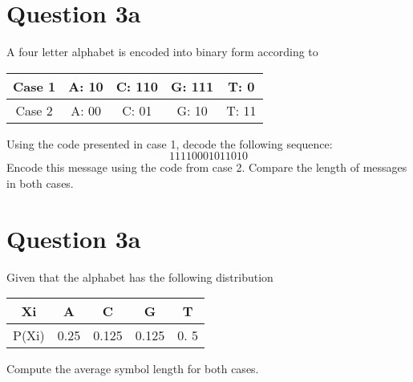 \section*{Question 3a}
A four letter alphabet is encoded into binary form according to
\begin{tabular}{|c|c|c|c|c|}
\hline
Case 1	&	A:  10 	&	C:  110	&	G:  111	& T:  0 \\ \hline
Case 2	&	A:  00	&	C:  01	&		G: 10	&	T: 11 \\ \hline
\end{tabular} 
	

Using the code presented in case 1, decode the following sequence:	
\[11110001011010\]
Encode this message using the code from case 2. Compare the length of messages in both cases.

\section*{Question 3a}
Given that the alphabet has the following distribution 
\begin{tabular}{|c|c|c|c|c|}
\hline
Xi & A & C & G & T \\ \hline
P(Xi) & 0.25 & 0.125 & 0.125 & 0. 5 \\
\hline
\end{tabular} 

Compute the average symbol length for both cases.

